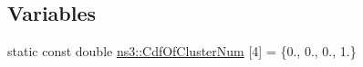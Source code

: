 \subsection*{Variables}
\begin{DoxyCompactItemize}
\item 
static const double \hyperlink{namespacens3_a0eb7871a74ed84d4c17051cf7a9d62a9}{ns3\+::\+Cdf\+Of\+Cluster\+Num} \mbox{[}4\mbox{]} = \{0., 0., 0., 1.\}
\end{DoxyCompactItemize}
